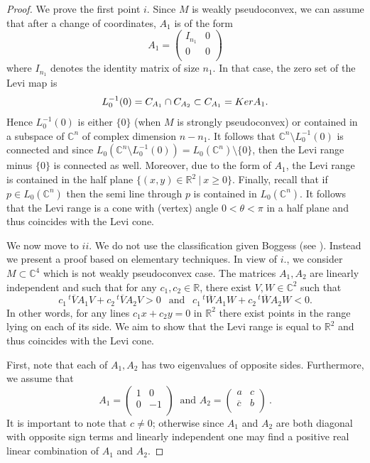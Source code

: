 \documentclass[10pt,a4paper]{amsart}
\newcommand{\C}{\mathbb C}
\newcommand{\R}{\mathbb R}
\newcommand{\transp}{\,^t}
\numberwithin{equation}{section}
\begin{document}
\begin{proof}
We prove the first point $i.$ Since $M$ is weakly pseudoconvex, we can assume that after a change of coordinates, $A_1$ is of the form  
$$A_1=\begin{pmatrix}
I_{n_1} & 0 \\
0 & 0\\
\end{pmatrix} $$
where $I_{n_1}$ denotes the identity matrix of size $n_1$. In that case, the zero set of the Levi map is
$$L_0^{-1}(0)=C_{A_1} \cap C_{A_2} \subset C_{A_1}={\rm Ker } A_1.$$
Hence $L_0^{-1}(0)$ is either $\{0\}$ (when $M$ is strongly pseudoconvex) or contained in a subspace of $\C^n$ of complex dimension $n-n_1$. It follows that  $\C^n \setminus L_0^{-1}(0)$ is connected and since 
 $L_0(\C^n\setminus L_0^{-1}(0))=L_0(\C^n) \setminus \{0\}$, then the Levi range minus $\{0\}$ is connected as well. Moreover, due to the form of $A_1$, the Levi range is contained in the half plane $\{ (x,y) \in \R^2 \ | \ x \geq 0\}$.     
 Finally, recall that if $p \in L_0(\C^n)$ then the semi line through $p$ is contained in $L_0(\C^n)$. It follows that the Levi range is a  cone with (vertex) angle $0<\theta<\pi$ in a half plane and thus coincides with the Levi cone.

\vspace{0.5cm}
We now move to  $ii$. We do not use the classification given Boggess (see \cite{bo}). Instead we present a proof based on elementary techniques. In view of $i.$, we consider  $M \subset \C^4$ which is not weakly pseudoconvex case. The matrices $A_1, 
A_2$ are linearly independent and such that for any $c_1,c_2\in \R$, there exist $V,W \in \C^2$ such that 
$$c_1\transp\overline{V}A_1V+ c_2\transp\overline{V}A_2V > 0 \ \ \mbox{ and } \ \ c_1\transp\overline{W}A_1W+ 
c_2\transp\overline{W}A_2W < 0.$$
In other words, for any lines $c_1x+c_2y=0$ in $\R^2$ there exist points in the range lying on each of its side. We aim to show that 
the Levi range is equal to $\R^2$ and thus coincides with the Levi 
cone. 

First, note that each of $A_1,A_2$ has two eigenvalues of opposite sides. Furthermore, we assume that 
$$A_1=\begin{pmatrix}
1 & 0 \\
0 & -1\\
\end{pmatrix} \ \mbox{ and } A_2=\begin{pmatrix}
a & c \\
\overline{c} & b\\
\end{pmatrix}\ 
.$$
 It is important to note that $c\neq0$; otherwise since $A_1$ and $A_2$ are both diagonal with opposite sign terms and linearly independent one may find a positive real linear combination of $A_1$ and $A_2$. 
 

\end{proof}
\end{document}
